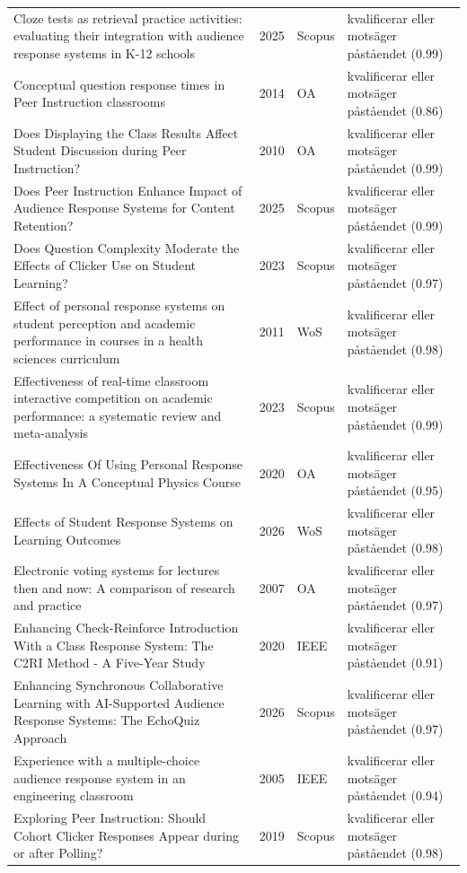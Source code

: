 \begin{longtable}{@{}%
  >{\raggedright\arraybackslash}p{}c%
  >{\raggedright\arraybackslash}p{}%
  >{\raggedright\arraybackslash}p{}@{}}
Cloze tests as retrieval practice activities: evaluating their integration with audience response systems in K-12 schools & 2025 & Scopus & kvalificerar eller motsäger påståendet (0.99) \\
Conceptual question response times in Peer Instruction classrooms & 2014 & OA & kvalificerar eller motsäger påståendet (0.86) \\
Does Displaying the Class Results Affect Student Discussion during Peer Instruction? & 2010 & OA & kvalificerar eller motsäger påståendet (0.99) \\
Does Peer Instruction Enhance Impact of Audience Response Systems for Content Retention? & 2025 & Scopus & kvalificerar eller motsäger påståendet (0.99) \\
Does Question Complexity Moderate the Effects of Clicker Use on Student Learning? & 2023 & Scopus & kvalificerar eller motsäger påståendet (0.97) \\
Effect of personal response systems on student perception and academic performance in courses in a health sciences curriculum & 2011 & WoS & kvalificerar eller motsäger påståendet (0.98) \\
Effectiveness of real-time classroom interactive competition on academic performance: a systematic review and meta-analysis & 2023 & Scopus & kvalificerar eller motsäger påståendet (0.99) \\
Effectiveness Of Using Personal Response Systems In A Conceptual Physics Course & 2020 & OA & kvalificerar eller motsäger påståendet (0.95) \\
Effects of Student Response Systems on Learning Outcomes & 2026 & WoS & kvalificerar eller motsäger påståendet (0.98) \\
Electronic voting systems for lectures then and now: A comparison of research and practice & 2007 & OA & kvalificerar eller motsäger påståendet (0.97) \\
Enhancing Check-Reinforce Introduction With a Class Response System: The C2RI Method - A Five-Year Study & 2020 & IEEE & kvalificerar eller motsäger påståendet (0.91) \\
Enhancing Synchronous Collaborative Learning with AI-Supported Audience Response Systems: The EchoQuiz Approach & 2026 & Scopus & kvalificerar eller motsäger påståendet (0.97) \\
Experience with a multiple-choice audience response system in an engineering classroom & 2005 & IEEE & kvalificerar eller motsäger påståendet (0.94) \\
Exploring Peer Instruction: Should Cohort Clicker Responses Appear during or after Polling? & 2019 & Scopus & kvalificerar eller motsäger påståendet (0.98) \\

\end{longtable}
